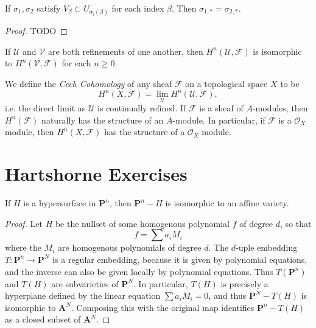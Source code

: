 \begin{lemma}
    If $\sigma_1,\sigma_2$ satisfy $V_\beta \subset U_{\sigma_i(\beta)}$ for each index $\beta$. Then $\sigma_{1,*} = \sigma_{2,*}$.
\end{lemma}
\begin{proof}
    TODO
\end{proof}

\begin{corollary}
    If $\mathcal{U}$ and $\mathcal{V}$ are both refinements of one another, then $H^n(\mathcal{U},\mathcal{F})$ is isomorphic to $H^n(\mathcal{V},\mathcal{F})$ for each $n \geq 0$.
\end{corollary}

We define the \emph{Cech Cohomology} of any sheaf $\mathcal{F}$ on a topological space $X$ to be
%
\[ H^n(X,\mathcal{F}) = \lim_{\mathcal{U}} H^n(\mathcal{U},\mathcal{F}), \]
%
i.e. the direct limit as $\mathcal{U}$ is continually refined. If $\mathcal{F}$ is a sheaf of $A$-modules, then $H^n(\mathcal{F})$ naturally has the structure of an $A$-module. In particular, if $\mathcal{F}$ is a $\mathcal{O}_X$ module, then $H^n(X,\mathcal{F})$ has the structure of a $\mathcal{O}_X$ module.














\chapter{Hartshorne Exercises}

\begin{theorem}
    If $H$ is a hypersurface in $\mathbf{P}^n$, then $\mathbf{P}^n - H$ is isomorphic to an affine variety.
\end{theorem}
\begin{proof}
    Let $H$ be the nullset of some homogenous polynomial $f$ of degree $d$, so that
    \[ f = \sum a_iM_i \]
    where the $M_i$ are homogenous polynomials of degree $d$. The $d$-uple embedding $T: \mathbf{P}^n \to \mathbf{P}^N$ is a regular embedding, because it is given by polynomial equations, and the inverse can also be given locally by polynomial equations. Thus $T(\mathbf{P}^n)$ and $T(H)$ are subvarieties of $\mathbf{P}^N$. In particular, $T(H)$ is precisely a hyperplane defined by the linear equation $\sum a_iM_i = 0$, and thus $\mathbf{P}^N - T(H)$ is isomorphic to $\mathbf{A}^N$. Composing this with the original map identifies $\mathbf{P}^n - T(H)$ as a closed subset of $\mathbf{A}^N$.
\end{proof}

